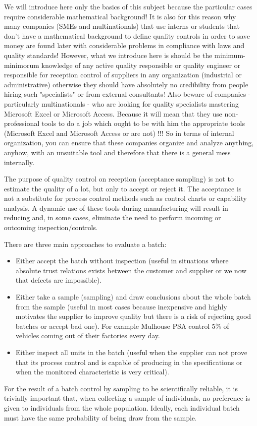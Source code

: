 	\begin{tcolorbox}[title=Remark,colframe=black,arc=10pt]
	We will introduce here only the basics of this subject because the particular cases require considerable mathematical background! It is also for this reason why many companies (SMEs and multinationals) that use interns or students that don't have a mathematical background to define quality controls in order to save money are found later with considerable problems in compliance with laws and quality standards! However, what we introduce here is should be the minimum-minimorum knowledge of any active  quality responsible or quality engineer or responsible for reception control of suppliers in any organization (industrial or administrative) otherwise they should have absolutely no credibility from people hiring such "specialists" or from external consultants! Also beware of companies - particularly multinationals - who are looking for quality specialists mastering Microsoft Excel or Microsoft Access. Because it will mean that they use non-professional tools to do a job which ought to be with him the appropriate tools (Microsoft Excel and Microsoft Access or are not) !!! So in terms of internal organization, you can ensure that these companies organize and analyze anything, anyhow, with an unsuitable tool and therefore that there is a general mess internally.
	\end{tcolorbox}
	The purpose of quality control on reception (acceptance sampling) is not to estimate the quality of a lot, but only to accept or reject it. The acceptance is not a substitute for process control methods such as control charts or capability analysis. A dynamic use of these tools during manufacturing will result in reducing and, in some cases, eliminate the need to perform incoming or outcoming inspection/controls.

	There are three main approaches to evaluate a batch:
	\begin{itemize}
		\item Either accept the batch without inspection (useful in situations where absolute trust relations exists between the customer and supplier or we now that defects are impossible).

		\item Either take a sample (sampling) and draw conclusions about the whole batch from the sample (useful in most cases because inexpensive and highly motivates the supplier to improve quality but there is a risk of rejecting good batches or accept bad one). For example Mulhouse PSA control $5\%$ of vehicles coming out of their factories every day.

		\item Either inspect all units in the batch (useful when the supplier can not prove that its process control and is capable of producing in the specifications or when the monitored characteristic is very critical).
	\end{itemize}
	For the result of a batch control by sampling to be scientifically reliable, it is trivially important that, when collecting a sample of individuals, no preference is given to individuals from the whole population. Ideally, each individual batch must have the same probability of being draw from the sample.

